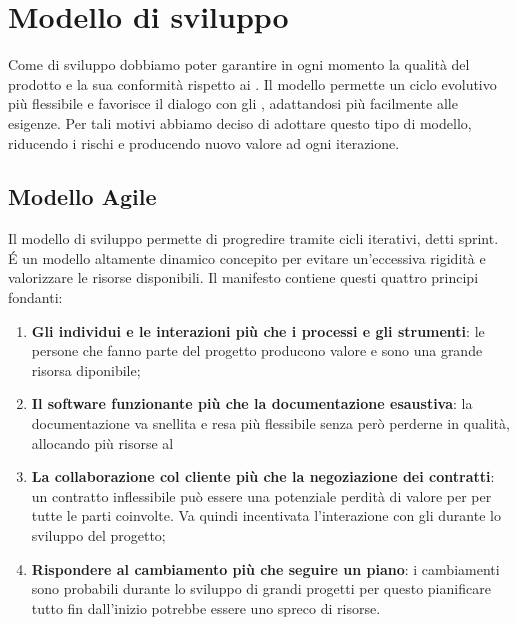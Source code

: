 \section{Modello di sviluppo}
Come  di sviluppo dobbiamo poter garantire in ogni momento la qualità del prodotto  e la sua conformità rispetto ai . \newline
Il modello  permette un ciclo evolutivo più flessibile e favorisce il dialogo con gli , adattandosi più facilmente alle esigenze. \newline 
Per tali motivi abbiamo deciso di adottare questo tipo di modello, riducendo i rischi e producendo nuovo valore ad ogni iterazione.

\subsection{Modello Agile}
Il modello di sviluppo  permette di progredire tramite cicli iterativi, detti sprint.
É un modello altamente dinamico concepito per evitare un'eccessiva rigidità e valorizzare le risorse disponibili. \newline
Il manifesto  contiene questi quattro principi fondanti:

\begin{enumerate}
    \item \textbf{Gli individui e le interazioni più che i processi e gli strumenti}: le persone che fanno parte del progetto producono valore e sono una grande risorsa diponibile;
    \item \textbf{Il software funzionante più che la documentazione esaustiva}: la documentazione va snellita e resa più flessibile senza però perderne in qualità, allocando più risorse al 
    \item \textbf{La collaborazione col cliente più che la negoziazione dei contratti}: un contratto inflessibile può essere una potenziale perdità di valore per per tutte le parti coinvolte. Va quindi incentivata l’interazione con gli  durante lo sviluppo del progetto;
    \item \textbf{Rispondere al cambiamento più che seguire un piano}: i cambiamenti sono probabili durante lo sviluppo di grandi progetti per questo pianificare tutto fin dall'inizio potrebbe essere uno spreco di risorse.
\end{enumerate}

